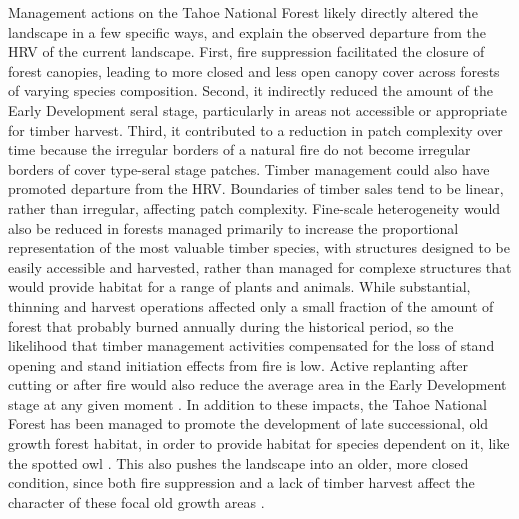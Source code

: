 Management actions on the Tahoe National Forest likely directly altered the landscape in a few specific ways, and explain the observed departure from the HRV of the current landscape. First, fire suppression facilitated the closure of forest canopies, leading to more closed and less open canopy cover across forests of varying species composition. Second, it indirectly reduced the amount of the Early Development seral stage, particularly in areas not accessible or appropriate for timber harvest. Third, it contributed to a reduction in patch complexity over time because the irregular borders of a natural fire do not become irregular borders of cover type-seral stage patches. Timber management could also have promoted departure from the HRV. Boundaries of timber sales tend to be linear, rather than irregular, affecting patch complexity. Fine-scale heterogeneity would also be reduced in forests managed primarily to increase the proportional representation of the most valuable timber species, with structures designed to be easily accessible and harvested, rather than managed for complexe structures that would provide habitat for a range of plants and animals. While substantial, thinning and harvest operations affected only a small fraction of the amount of forest that probably burned annually during the historical period, so the likelihood that timber management activities compensated for the loss of stand opening and stand initiation effects from fire is low. Active replanting after cutting or after fire would also reduce the average area in the Early Development stage at any given moment \citep{Dellasala2014}. In addition to these impacts, the Tahoe National Forest has been managed to promote the development of late successional, old growth forest habitat, in order to provide habitat for species dependent on it, like the spotted owl \citep{USDAForestService2004a}. This also pushes the landscape into an older, more closed condition, since both fire suppression and a lack of timber harvest affect the character of these focal old growth areas \citep{Franklin1996}.



